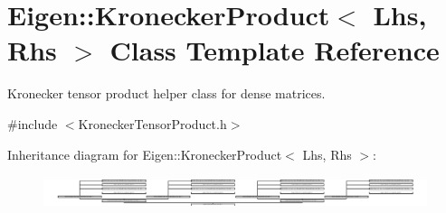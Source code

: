 \hypertarget{class_eigen_1_1_kronecker_product}{}\section{Eigen\+:\+:Kronecker\+Product$<$ Lhs, Rhs $>$ Class Template Reference}
\label{class_eigen_1_1_kronecker_product}


Kronecker tensor product helper class for dense matrices.  




{\ttfamily \#include $<$Kronecker\+Tensor\+Product.\+h$>$}

Inheritance diagram for Eigen\+:\+:Kronecker\+Product$<$ Lhs, Rhs $>$\+:\begin{figure}[H]
\begin{center}
\leavevmode
\includegraphics[height=0.978044cm]{class_eigen_1_1_kronecker_product}
\end{center}
\end{figure}
